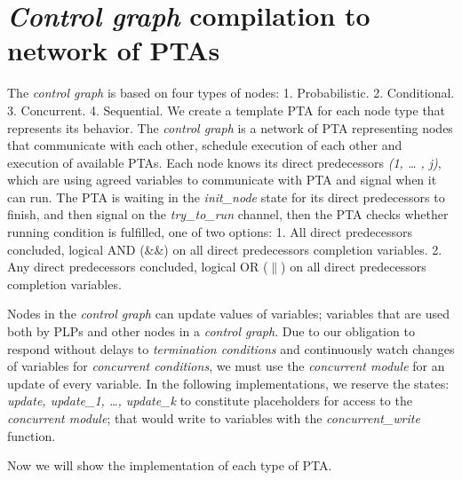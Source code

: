 \section{\textit{Control graph} compilation to network of PTAs}
The \textit{control graph} is based on four types of nodes: 1. Probabilistic. 2. Conditional. 3. Concurrent. 4. Sequential. We create a template PTA for each node type that represents its behavior. The \textit{control graph} is a network of PTA representing nodes that communicate with each other, schedule execution of each other and execution of available PTAs. Each node knows its direct predecessors \textit{(1, … , j)}, which are using agreed variables to communicate with PTA and signal when it can run. The PTA is waiting in the \textcolor{ColorUppaalState}{\textit{init_node}} state for its direct predecessors to finish, and then signal on the \textcolor{ColorUppaalChannel}{\textit{try_to_run }}channel, then the PTA checks whether running condition is fulfilled, one of two options: 1. All direct predecessors concluded, logical AND (\&\&) on all direct predecessors completion variables. 2. Any direct predecessors concluded, logical OR ($\|$) on all direct predecessors completion variables.
\par Nodes in the \textit{control graph} can update values of variables; variables that are used both by PLPs and other nodes in a \textit{control graph}. Due to our obligation to respond without delays to \textit{termination conditions} and continuously watch changes of variables for \textit{concurrent conditions}, we must use the \textit{concurrent module} for an update of every variable. In the following implementations, we reserve the states: \textit{\textcolor{ColorUppaalState}{update, update\_1, …, update\_k}} to constitute placeholders for access to the \textit{concurrent module}; that would write to variables with the \textcolor{ColorUppaalFunction}{\textit{concurrent_write}}​ function.
\par Now we will show the implementation of each type of PTA.\\
\clearpage
